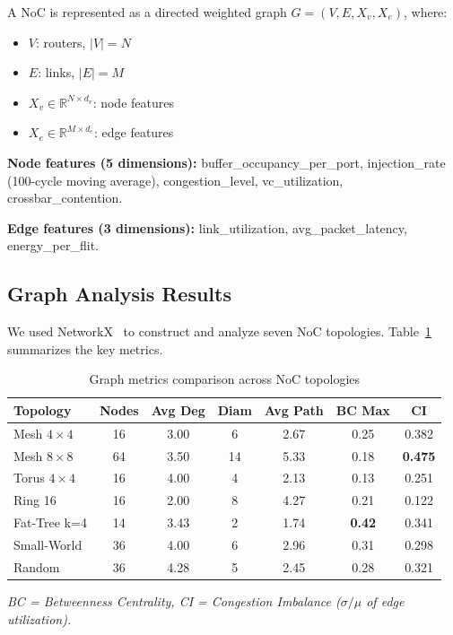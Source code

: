 \documentclass[conference]{IEEEtran}
\begin{document}
A NoC is represented as a directed weighted graph $G=(V,E,X_v,X_e)$, where:
\begin{itemize}
 \item $V$: routers, $|V|=N$
 \item $E$: links, $|E|=M$
 \item $X_v\in\mathbb{R}^{N\times d_v}$: node features
 \item $X_e\in\mathbb{R}^{M\times d_e}$: edge features
\end{itemize}

\textbf{Node features (5 dimensions):} buffer\_occupancy\_per\_port, injection\_rate (100-cycle moving average), congestion\_level, vc\_utilization, crossbar\_contention.

\textbf{Edge features (3 dimensions):} link\_utilization, avg\_packet\_latency, energy\_per\_flit.

\subsection{Graph Analysis Results}

We used NetworkX~\cite{networkx2008} to construct and analyze seven NoC topologies. Table~\ref{tab:metrics} summarizes the key metrics.

\begin{table}[h]
\centering
\caption{Graph metrics comparison across NoC topologies}
\label{tab:metrics}
\small
\begin{tabular}{lcccccc}
\toprule
\textbf{Topology} & \textbf{Nodes} & \textbf{Avg Deg} & \textbf{Diam} & \textbf{Avg Path} & \textbf{BC Max} & \textbf{CI} \\
\midrule
Mesh $4\times4$ & 16 & 3.00 & 6 & 2.67 & 0.25 & 0.382 \\
Mesh $8\times8$ & 64 & 3.50 & 14 & 5.33 & 0.18 & \textbf{0.475} \\
Torus $4\times4$ & 16 & 4.00 & 4 & 2.13 & 0.13 & 0.251 \\
Ring 16 & 16 & 2.00 & 8 & 4.27 & 0.21 & 0.122 \\
Fat-Tree k=4 & 14 & 3.43 & 2 & 1.74 & \textbf{0.42} & 0.341 \\
Small-World & 36 & 4.00 & 6 & 2.96 & 0.31 & 0.298 \\
Random & 36 & 4.28 & 5 & 2.45 & 0.28 & 0.321 \\
\bottomrule
\end{tabular}
\vspace{2mm}
\small\textit{BC = Betweenness Centrality, CI = Congestion Imbalance ($\sigma/\mu$ of edge utilization).}
\end{table}
\end{document}
